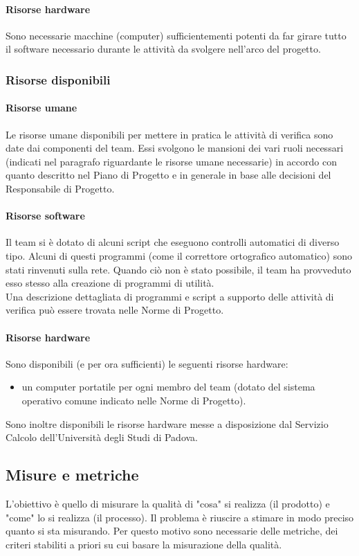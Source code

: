 				\paragraph{Risorse hardware}
					Sono necessarie macchine (computer) sufficientementi potenti da far girare tutto il software necessario durante le attività da
					svolgere nell'arco del progetto.
			\subsubsection{Risorse disponibili}
				\paragraph{Risorse umane}
					Le risorse umane disponibili per mettere in pratica le attività di verifica sono date dai componenti del team. Essi svolgono le 
					mansioni dei vari ruoli necessari (indicati nel paragrafo riguardante le risorse umane necessarie) in accordo con quanto descritto 
					nel Piano di Progetto e in generale in base alle decisioni del Responsabile di Progetto.
				\paragraph{Risorse software}
					Il team si è dotato di alcuni script che eseguono controlli automatici di diverso tipo. Alcuni di questi programmi (come il 
					correttore ortografico automatico) sono stati rinvenuti sulla rete. Quando ciò non è stato possibile, il team ha provveduto esso 
					stesso alla creazione di programmi di utilità.\\
					Una descrizione dettagliata di programmi e script a supporto delle attività di verifica può essere trovata nelle Norme di Progetto.
				\paragraph{Risorse hardware}
					Sono disponibili (e per ora sufficienti) le seguenti risorse hardware:
					\begin{itemize}
						\item un computer portatile per ogni membro del team (dotato del sistema operativo comune indicato nelle Norme di Progetto).
					\end{itemize}
					Sono inoltre disponibili le risorse hardware messe a disposizione dal Servizio Calcolo dell'Università degli Studi di Padova.
		\subsection{Misure e metriche}
			L'obiettivo è quello di misurare la qualità di "cosa" si realizza (il prodotto) e "come" lo si realizza (il processo). Il problema è 
			riuscire a stimare in modo preciso quanto si sta misurando. Per questo motivo sono necessarie delle metriche, dei criteri stabiliti a 
			priori su cui basare la misurazione della qualità.

